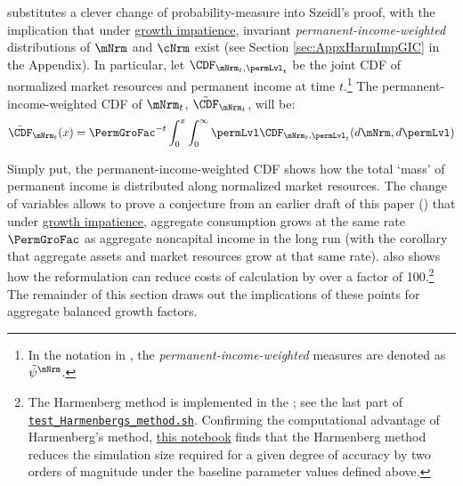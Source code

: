 \documentclass[BufferStockTheory]{subfiles}
\begin{document}
\cite{harmenbergInvariant} substitutes a clever change of probability-measure into Szeidl's proof, with the implication that under \hyperlink{GIC}{growth impatience}, invariant \emph{permanent-income-weighted} distributions of $\mNrm$ and $\cNrm$ exist (see Section \ref{sec:AppxHarmImpGIC} in the Appendix).
In particular, let $\CDF_{\mNrm_{t},\permLvl_{t}}$ be the joint CDF of normalized market resources and permanent income at time $t$.\footnote{In the notation in \cite{harmenbergInvariant}, the \emph{permanent-income-weighted} measures are denoted as $\tilde{\psi}^{\mNrm}$.} The permanent-income-weighted CDF of $\mNrm_{t}$, $\Harm{\CDF}_{\mNrm_{t}}$, will be:
%
\begin{equation}\label{eq:HarmCDF}
\Harm{\CDF}_{\mNrm_{t}}(x) = \PermGroFac^{-t}\int_{0}^{x}\int_{0}^{\infty} \permLvl\CDF_{\mNrm_{t},\permLvl_{t}}(d\mNrm,d\permLvl)
\end{equation}

Simply put, the permanent-income-weighted CDF shows how the total `mass' of permanent income is distributed along normalized market resources. The change of variables allows \cite{harmenbergInvariant} to prove a conjecture from an earlier draft of this paper (\cite{BufferStockTheoryQESubmit}) that under \hyperlink{GIC}{growth impatience}, aggregate consumption grows at the same rate $\PermGroFac$ as aggregate noncapital income in the long run (with the corollary that aggregate assets and market resources grow at that same rate).\hypertarget{test-Harmenbergs-method}{} \cite{harmenbergInvariant} also shows how the reformulation can reduce costs of calculation by over a factor of 100.\footnote{The Harmenberg method is implemented in the {\ARKurl}; see the last part of \href{https://github.com/econ-ark/BufferStockTheory/blob/master/Code/Python/test_Harmenbergs_method.sh}{\texttt{test\_Harmenbergs\_method.sh}}.
Confirming the computational advantage of Harmenberg's method, \href{https://econ-ark.org/materials/harmenberg-aggregation}{this notebook} finds that the Harmenberg method reduces the simulation size required for a given degree of accuracy by two orders of magnitude under the baseline parameter values defined above.} The remainder of this section draws out the implications of these points for aggregate balanced growth factors.
\end{document}
